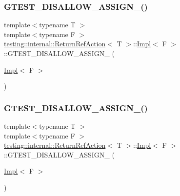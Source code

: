 \subsubsection{\texorpdfstring{GTEST\_DISALLOW\_ASSIGN\_()}{GTEST\_DISALLOW\_ASSIGN\_()}\hspace{0.1cm}{\footnotesize\ttfamily [2/3]}}
{\footnotesize\ttfamily template$<$typename T $>$ \\
template$<$typename F $>$ \\
\mbox{\hyperlink{classtesting_1_1internal_1_1_return_ref_action}{testing\+::internal\+::\+Return\+Ref\+Action}}$<$ T $>$\+::\mbox{\hyperlink{classtesting_1_1internal_1_1_return_ref_action_1_1_impl}{Impl}}$<$ F $>$\+::G\+T\+E\+S\+T\+\_\+\+D\+I\+S\+A\+L\+L\+O\+W\+\_\+\+A\+S\+S\+I\+G\+N\+\_\+ (\begin{DoxyParamCaption}\item[{\mbox{\hyperlink{classtesting_1_1internal_1_1_return_ref_action_1_1_impl}{Impl}}$<$ F $>$}]{ }\end{DoxyParamCaption})\hspace{0.3cm}{\ttfamily [private]}}

\mbox{\label{classtesting_1_1internal_1_1_return_ref_action_1_1_impl_ad2899b6718fb8b8aaca38419c27c2765}} 
\subsubsection{\texorpdfstring{GTEST\_DISALLOW\_ASSIGN\_()}{GTEST\_DISALLOW\_ASSIGN\_()}\hspace{0.1cm}{\footnotesize\ttfamily [3/3]}}
{\footnotesize\ttfamily template$<$typename T $>$ \\
template$<$typename F $>$ \\
\mbox{\hyperlink{classtesting_1_1internal_1_1_return_ref_action}{testing\+::internal\+::\+Return\+Ref\+Action}}$<$ T $>$\+::\mbox{\hyperlink{classtesting_1_1internal_1_1_return_ref_action_1_1_impl}{Impl}}$<$ F $>$\+::G\+T\+E\+S\+T\+\_\+\+D\+I\+S\+A\+L\+L\+O\+W\+\_\+\+A\+S\+S\+I\+G\+N\+\_\+ (\begin{DoxyParamCaption}\item[{\mbox{\hyperlink{classtesting_1_1internal_1_1_return_ref_action_1_1_impl}{Impl}}$<$ F $>$}]{ }\end{DoxyParamCaption})\hspace{0.3cm}{\ttfamily [private]}}

